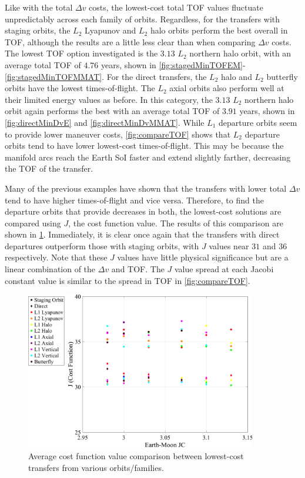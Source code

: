 Like with the total $\Delta v$ costs, the lowest-cost total TOF values fluctuate unpredictably
across each family of orbits. Regardless, for the transfers with staging orbits, the $L_{2}$
Lyapunov and $L_{2}$ halo orbits perform the best overall in TOF, although the results are a little
less clear than when comparing $\Delta v$ costs. The lowest TOF option investigated is the $3.13$
$L_{2}$ northern halo orbit, with an average total TOF of $4.76$ years, shown in
\cref{fig:stagedMinTOFEM}-\cref{fig:stagedMinTOFMMAT}. For the direct transfers, the $L_{2}$ halo
and $L_{2}$ butterfly orbits have the lowest times-of-flight. The $L_{2}$ axial orbits also perform
well at their limited energy values as before. In this category, the $3.13$ $L_{2}$ northern halo
orbit again performs the best with an average total TOF of $3.91$ years, shown in
\cref{fig:directMinDvE} and \cref{fig:directMinDvMMAT}. While $L_{1}$ departure orbits seem to
provide lower maneuver costs, \cref{fig:compareTOF} shows that $L_{2}$ departure orbits tend to
have lower lowest-cost times-of-flight. This may be because the manifold arcs reach the Earth SoI
faster and extend slightly farther, decreasing the TOF of the transfer.

Many of the previous examples have shown that the transfers with lower total $\Delta v$ tend to
have higher times-of-flight and vice versa. Therefore, to find the departure orbits that provide
decreases in both, the lowest-cost solutions are compared using $J$, the cost function value. The
results of this comparison are shown in \cref{fig:compareJ}. Immediately, it is clear once again
that the transfers with direct departures outperform those with staging orbits, with $J$ values
near $31$ and $36$ respectively. Note that these $J$ values have little physical significance but
are a linear combination of the $\Delta v$ and TOF. The $J$ value spread at each Jacobi constant
value is similar to the spread in TOF in \cref{fig:compareTOF}.

\begin{figure}[!htb]
    \centering
    \includegraphics[width=0.9\textwidth]{figures/JComparison.pdf}
    \caption{Average cost function value comparison between lowest-cost transfers from various orbits/families.}
    \label{fig:compareJ}
\end{figure}

